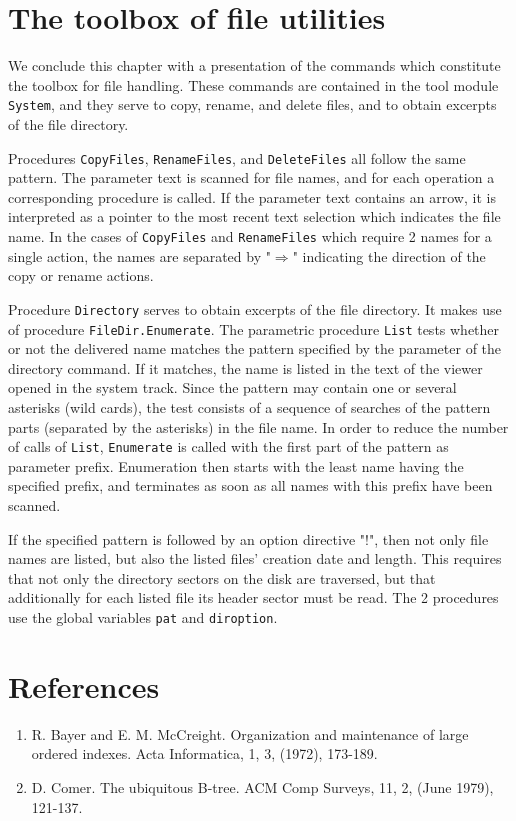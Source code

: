 \section{The toolbox of file utilities}
We conclude this chapter with a presentation of the commands which constitute the toolbox for file
handling. These commands are contained in the tool module \verb|System|, and they serve to copy,
rename, and delete files, and to obtain excerpts of the file directory.

Procedures \verb|CopyFiles|, \verb|RenameFiles|, and \verb|DeleteFiles| all follow the same pattern.
The parameter text is scanned for file names, and for each operation a corresponding procedure is
called. If the parameter text contains an arrow, it is interpreted as a pointer to the most recent text
selection which indicates the file name. In the cases of \verb|CopyFiles| and \verb|RenameFiles| which
require 2 names for a single action, the names are separated by "$\Rightarrow$" indicating the direction
of the copy or rename actions.

Procedure \verb|Directory| serves to obtain excerpts of the file directory. It makes use of procedure
\verb|FileDir.Enumerate|. The parametric procedure \verb|List| tests whether or not the delivered name
matches the pattern specified by the parameter of the directory command. If it matches, the name is
listed in the text of the viewer opened in the system track. Since the pattern may contain one or
several asterisks (wild cards), the test consists of a sequence of searches of the pattern parts
(separated by the asterisks) in the file name. In order to reduce the number of calls of \verb|List|,
\verb|Enumerate| is called with the first part of the pattern as parameter prefix. Enumeration then
starts with the least name having the specified prefix, and terminates as soon as all names with this
prefix have been scanned.

If the specified pattern is followed by an option directive "!", then not only file names are listed,
but also the listed files' creation date and length. This requires that not only the directory sectors
on the disk are traversed, but that additionally for each listed file its header sector must be read.
The 2 procedures use the global variables \verb|pat| and \verb|diroption|.

\section*{References}
\begin{enumerate}
  \item R. Bayer and E. M. McCreight. Organization and maintenance of large ordered indexes. Acta Informatica, 1, 3, (1972), 173-189.

  \item D. Comer. The ubiquitous B-tree. ACM Comp Surveys, 11, 2, (June 1979), 121-137.
\end{enumerate}
